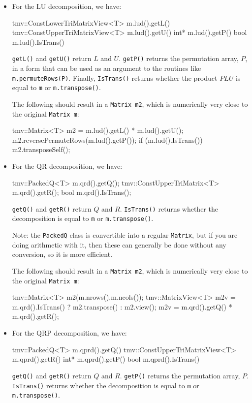 \documentclass[twoside,letterpaper,11pt]{article}
\renewcommand{\tt}[1]{{\lstinline {#1}}}
\begin{document}
\begin{itemize}
\item
For the LU decomposition, we have:
\begin{tmvcode}
tmv::ConstLowerTriMatrixView<T> m.lud().getL()
tmv::ConstUpperTriMatrixView<T> m.lud().getU()
int* m.lud().getP()
bool m.lud().IsTrans()
\end{tmvcode}
\tt{getL()} and \tt{getU()} return $L$ and $U$.
\tt{getP()} returns the permutation array, $P$, in a form
that can be used as an argument 
to the routines like \tt{m.permuteRows(P)}.  Finally, \tt{IsTrans()} returns whether
the product $PLU$ is equal to \tt{m} or \tt{m.transpose()}.  

The following should result in a \tt{Matrix m2}, which is numerically very close to
the original \tt{Matrix m}:
\begin{tmvcode}
tmv::Matrix<T> m2 = m.lud().getL() * m.lud().getU();
m2.reversePermuteRows(m.lud().getP());
if (m.lud().IsTrans()) m2.transposeSelf();
\end{tmvcode}

\item
For the QR decomposition, we have:
\begin{tmvcode}
tmv::PackedQ<T> m.qrd().getQ();
tmv::ConstUpperTriMatrix<T> m.qrd().getR();
bool m.qrd().IsTrans();
\end{tmvcode}
\tt{getQ()} and \tt{getR()} return $Q$ and $R$.  
\tt{IsTrans()} returns whether
the decomposition is equal to \tt{m} or \tt{m.transpose()}.  

Note: the \tt{PackedQ} class is convertible into a regular \tt{Matrix}, but if you are doing 
arithmetic with it, then these can generally be done without any conversion,
so it is more efficient.

The following should result in a \tt{Matrix m2}, which is numerically very close to
the original \tt{Matrix m}:
\begin{tmvcode}
tmv::Matrix<T> m2(m.nrows(),m.ncols());
tmv::MatrixView<T> m2v = 
      m.qrd().IsTrans() ? m2.transpose() : m2.view();
m2v = m.qrd().getQ() * m.qrd().getR();
\end{tmvcode}

\item
For the QRP decomposition, we have:
\begin{tmvcode}
tmv::PackedQ<T> m.qprd().getQ()
tmv::ConstUpperTriMatrixView<T> m.qprd().getR()
int* m.qprd().getP()
bool m.qprd().IsTrans()
\end{tmvcode}
\tt{getQ()} and \tt{getR()} return $Q$ and $R$.
\tt{getP()} returns the permutation array, $P$.
\tt{IsTrans()} returns whether
the decomposition is equal to \tt{m} or \tt{m.transpose()}.  


\end{itemize}
\end{document}
